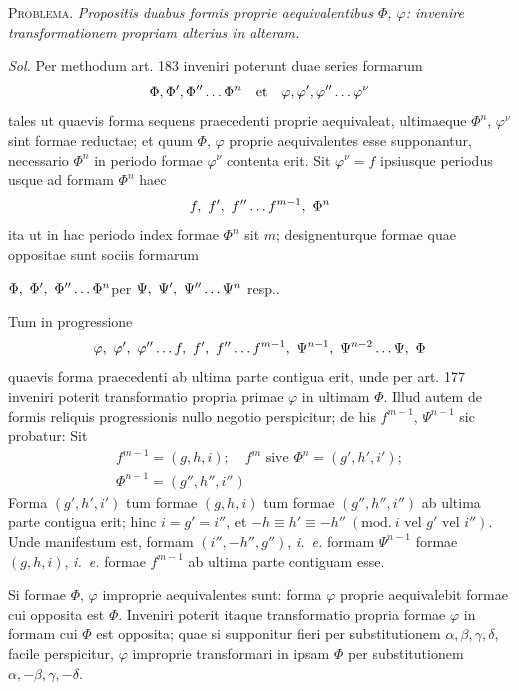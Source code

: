 \textsc{Problema.} \textit{Propositis duabus formis proprie aequivalentibus $\Phi$, $\varphi$: invenire transformationem propriam alterius in alteram.}

\textit{Sol.} Per methodum art. 183 inveniri poterunt duae series formarum
\[
\Phi,\Phi',\Phi''\mathinner{\ldotp\ldotp\ldotp}\Phi^n\quad\text{et}\quad\varphi,\varphi',\varphi''\mathinner{\ldotp\ldotp\ldotp}\varphi^\nu
\]
tales ut quaevis forma sequens praecedenti proprie aequivaleat, ultimaeque $\Phi^n$, $\varphi^\nu$ sint formae reductae; et quum $\Phi$, $\varphi$ proprie aequivalentes esse supponantur, necessario $\Phi^n$ in periodo formae $\varphi^\nu$ contenta erit. Sit $\varphi^\nu=f$ ipsiusque periodus usque ad formam $\Phi^n$ haec
\[
f,\ f',\ f''\mathinner{\ldotp\ldotp\ldotp} f^{m-1},\ \Phi^n
\]
ita ut in hac periodo index formae $\Phi^n$ sit $m$; designenturque formae quae oppositae sunt sociis formarum
\begin{center}
$\Phi,\ \Phi',\ \Phi''\mathinner{\ldotp\ldotp\ldotp}\Phi^n$\quad per $\Psi,\ \Psi',\ \Psi''\mathinner{\ldotp\ldotp\ldotp}\Psi^n$ resp..
\end{center}
Tum in progressione
\[
\varphi,\ \varphi',\ \varphi''\mathinner{\ldotp\ldotp\ldotp} f,\ f',\ f''\mathinner{\ldotp\ldotp\ldotp} f^{m-1},\ \Psi^{n-1},\ \Psi^{n-2}\mathinner{\ldotp\ldotp\ldotp}\Psi,\ \Phi
\]
quaevis forma praecedenti ab ultima parte contigua erit, unde per art. 177 inveniri poterit transformatio propria primae $\varphi$ in ultimam $\Phi$. Illud autem de formis reliquis progressionis nullo negotio perspicitur; de his $f^{m-1}$, $\Psi^{n-1}$ sic probatur: Sit
\[
\begin{gathered}f^{m-1}=(g,h,i);\quad f^m\text{ sive }\Phi^n=(g',h',i');\\ \Phi^{n-1}=(g'',h'',i'')\end{gathered}
\]
Forma $(g',h',i')$ tum formae $(g,h,i)$ tum formae $(g'',h'',i'')$ ab ultima parte contigua erit; hinc $i=g'=i''$, et $-h\equiv h'\equiv-h''\ (\mathrm{mod.}\ i\text{ vel }g'\text{ vel }i'')$. Unde manifestum est, formam $(i'',-h'',g'')$, \textit{i. e.} formam $\Psi^{n-1}$ formae $(g,h,i)$, \textit{i. e.} formae $f^{m-1}$ ab ultima parte contiguam esse.

Si formae $\Phi$, $\varphi$ improprie aequivalentes sunt: forma $\varphi$ proprie aequivalebit formae cui opposita est $\Phi$. Inveniri poterit itaque transformatio propria formae $\varphi$ in formam cui $\Phi$ est opposita; quae si supponitur fieri per substitutionem $\alpha,\beta,\gamma,\delta$, facile perspicitur, $\varphi$ improprie transformari in ipsam $\Phi$ per substitutionem $\alpha,-\beta,\gamma,-\delta$.

